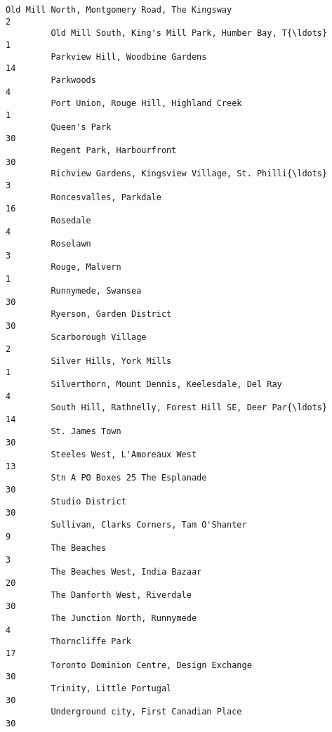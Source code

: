 \documentclass[11pt]{article}
\begin{document}
\begin{Verbatim}[commandchars=\\\{\}]
         Old Mill North, Montgomery Road, The Kingsway                           2   
         Old Mill South, King's Mill Park, Humber Bay, T{\ldots}                      1   
         Parkview Hill, Woodbine Gardens                                        14   
         Parkwoods                                                               4   
         Port Union, Rouge Hill, Highland Creek                                  1   
         Queen's Park                                                           30   
         Regent Park, Harbourfront                                              30   
         Richview Gardens, Kingsview Village, St. Philli{\ldots}                      3   
         Roncesvalles, Parkdale                                                 16   
         Rosedale                                                                4   
         Roselawn                                                                3   
         Rouge, Malvern                                                          1   
         Runnymede, Swansea                                                     30   
         Ryerson, Garden District                                               30   
         Scarborough Village                                                     2   
         Silver Hills, York Mills                                                1   
         Silverthorn, Mount Dennis, Keelesdale, Del Ray                          4   
         South Hill, Rathnelly, Forest Hill SE, Deer Par{\ldots}                     14   
         St. James Town                                                         30   
         Steeles West, L'Amoreaux West                                          13   
         Stn A PO Boxes 25 The Esplanade                                        30   
         Studio District                                                        30   
         Sullivan, Clarks Corners, Tam O'Shanter                                 9   
         The Beaches                                                             3   
         The Beaches West, India Bazaar                                         20   
         The Danforth West, Riverdale                                           30   
         The Junction North, Runnymede                                           4   
         Thorncliffe Park                                                       17   
         Toronto Dominion Centre, Design Exchange                               30   
         Trinity, Little Portugal                                               30   
         Underground city, First Canadian Place                                 30   

\end{Verbatim}
\end{document}
